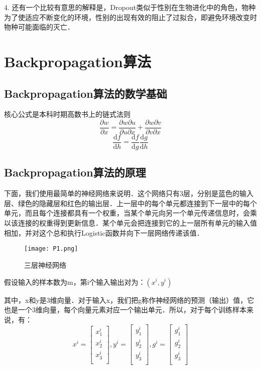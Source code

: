 4. 还有一个比较有意思的解释是，Dropout类似于性别在生物进化中的角色，物种为了使适应不断变化的环境，性别的出现有效的阻止了过拟合，即避免环境改变时物种可能面临的灭亡．

\section{Backpropagation算法\cite{2}}
\subsection{Backpropagation算法的数学基础}
核心公式是本科时期高数书上的链式法则
$$\frac{\partial w}{\partial x}=\frac{\partial w\partial u}{\partial u \partial x}+\frac{\partial w \partial v}{\partial v \partial x}$$
$$\frac{\mathrm{d}f}{\mathrm{d}h}=\frac{\mathrm{d}f}{\mathrm{d}g}\frac{\mathrm{d}g}{\mathrm{d}h}$$
\subsection{Backpropagation算法的原理}
下面，我们使用最简单的神经网络来说明．这个网络只有3层，分别是蓝色的输入层、绿色的隐藏层和红色的输出层．上一层中的每个单元都连接到下一层中的每个单元，而且每个连接都具有一个权重，当某个单元向另一个单元传递信息时，会乘以该连接的权重得到更新信息．某个单元会把连接到它的上一层所有单元的输入值相加，并对这个总和执行Logistic函数并向下一层网络传递该值．

	\begin{figure}[htbp]
		\centering
		\texttt{[image: P1.png]}
		\caption{三层神经网络}
		\label{figl}
	\end{figure}

假设输入的样本数为m，第i个输入输出对为：$(x^i,y^i)$

其中，x和y是3维向量．对于输入x，我们把g称作神经网络的预测（输出）值，它也是一个3维向量，每个向量元素对应一个输出单元．所以，对于每个训练样本来说，有：
$$
x^i= \begin{bmatrix}
	x^i_1 \\
	x^i_2 \\
	x^i_3 \\
\end{bmatrix} ,
y^i= \begin{bmatrix}
	y^i_1 \\
	y^i_2 \\
	y^i_3 \\
\end{bmatrix} ,
g^i= \begin{bmatrix}
	g^i_1 \\
	g^i_2 \\
	g^i_3 \\
\end{bmatrix} 
$$

